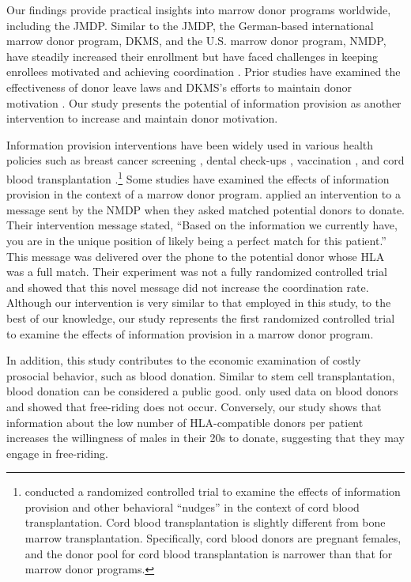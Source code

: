 \documentclass[12pt, a4paper]{article}
\begin{document}
Our findings provide practical insights into marrow donor programs worldwide, including the JMDP. Similar to the JMDP, the German-based international marrow donor program, DKMS, and the U.S. marrow donor program, NMDP, have steadily increased their enrollment but have faced challenges in keeping enrollees motivated and achieving coordination \citep{Switzer1999, Switzer2004, Haylock2024}. Prior studies have examined the effectiveness of donor leave laws \citep{Lacetera2014} and DKMS's efforts to maintain donor motivation \citep{Haylock2024}. Our study presents the potential of information provision as another intervention to increase and maintain donor motivation.

Information provision interventions have been widely used in various health policies such as breast cancer screening \citep{Bertoni2020}, dental check-ups \citep{Altmann2014}, vaccination \citep[e.g.,][]{Dai2021, Milkman2021}, and cord blood transplantation \citep{Grieco2018}.\footnote{\citet{Grieco2018} conducted a randomized controlled trial to examine the effects of information provision and other behavioral ``nudges'' in the context of cord blood transplantation. Cord blood transplantation is slightly different from bone marrow transplantation. Specifically, cord blood donors are pregnant females, and the donor pool for cord blood transplantation is narrower than that for marrow donor programs.} Some studies have examined the effects of information provision in the context of a marrow donor program. \citet{Switzer2018} applied an intervention to a message sent by the NMDP when they asked matched potential donors to donate. Their intervention message stated, ``Based on the information we currently have, you are in the unique position of likely being a perfect match for this patient.'' This message was delivered over the phone to the potential donor whose HLA was a full match. Their experiment was not a fully randomized controlled trial and showed that this novel message did not increase the coordination rate. Although our intervention is very similar to that employed in this study, to the best of our knowledge, our study represents the first randomized controlled trial to examine the effects of information provision in a marrow donor program.

In addition, this study contributes to the economic examination of costly prosocial behavior, such as blood donation. Similar to stem cell transplantation, blood donation can be considered a public good. \citet{Wildman2009} only used data on blood donors and showed that free-riding does not occur. Conversely, our study shows that information about the low number of HLA-compatible donors per patient increases the willingness of males in their 20s to donate, suggesting that they may engage in free-riding.
\end{document}
